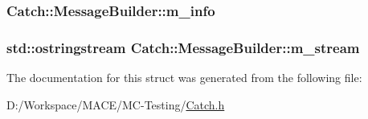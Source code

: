 \subsubsection[{\texorpdfstring{m\+\_\+info}{m_info}}]{ Catch\+::\+Message\+Builder\+::m\+\_\+info}\hypertarget{struct_catch_1_1_message_builder_a979f1c2b36d78f80ee275bfa5ba0209f}{}\label{struct_catch_1_1_message_builder_a979f1c2b36d78f80ee275bfa5ba0209f}
\subsubsection[{\texorpdfstring{m\+\_\+stream}{m_stream}}]{\setlength{\rightskip}{0pt plus 5cm}std\+::ostringstream Catch\+::\+Message\+Builder\+::m\+\_\+stream}\hypertarget{struct_catch_1_1_message_builder_a6488ab0cc4ea52affc9c0612c7c5df6b}{}\label{struct_catch_1_1_message_builder_a6488ab0cc4ea52affc9c0612c7c5df6b}


The documentation for this struct was generated from the following file\+:\begin{DoxyCompactItemize}
\item 
D\+:/\+Workspace/\+M\+A\+C\+E/\+M\+C-\/\+Testing/\hyperlink{_catch_8h}{Catch.\+h}\end{DoxyCompactItemize}

